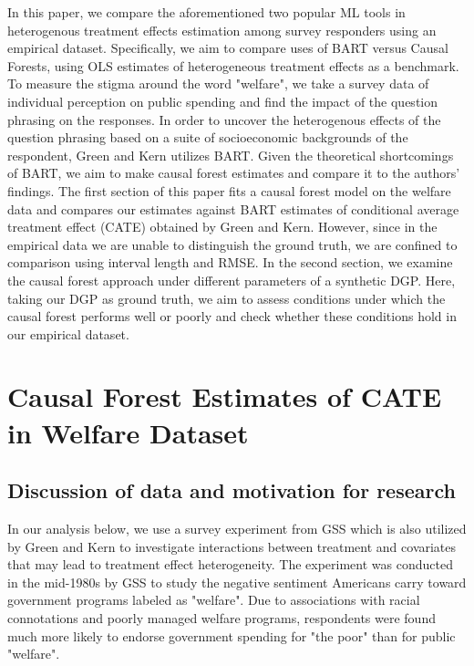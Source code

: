 \documentclass[12pt]{article}
\begin{document}
In this paper, we compare the aforementioned two popular ML tools in
heterogenous treatment effects estimation among survey responders using an
empirical dataset. Specifically, we aim to compare uses of BART versus Causal
Forests, using OLS estimates of heterogeneous treatment effects as a benchmark.
To measure the stigma around the word "welfare", we take a survey data of
individual perception on public spending and find the impact of the question
phrasing on the responses. In order to uncover the heterogenous effects of the
question phrasing based on a suite of socioeconomic backgrounds of the
respondent, Green and Kern utilizes BART. Given the theoretical shortcomings of
BART, we aim to make causal forest estimates and compare it to the authors'
findings. The first section of this paper fits a causal forest model on the welfare data and compares our estimates against BART estimates of conditional average treatment effect (CATE) obtained by Green and Kern. However, since in the empirical data we are unable to distinguish the ground truth, we are confined to comparison using interval length and RMSE. In the second section, we examine the causal forest approach under different parameters of a synthetic DGP. Here, taking our DGP as ground truth, we aim to assess conditions under which the causal forest performs well or poorly and check whether these conditions hold in our empirical dataset. \\ 

\section{Causal Forest Estimates of CATE in Welfare Dataset}

\subsection{Discussion of data and motivation for research} 
In our analysis below, we use a survey experiment from GSS which is also utilized by Green and Kern to investigate interactions between treatment and covariates that may lead to treatment effect heterogeneity. The experiment was conducted in the mid-1980s by GSS to study the negative sentiment Americans carry toward government programs labeled as "welfare". Due to associations with racial connotations and poorly managed welfare programs, respondents were found much more likely to endorse government spending for "the poor" than for public "welfare".\cite{rasinski1989}\\
\end{document}
